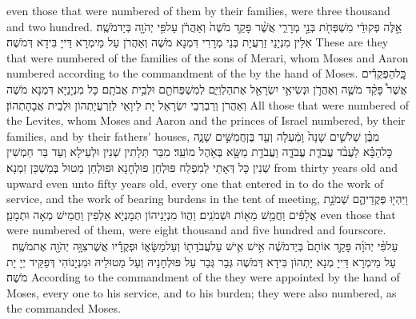 {even those that were numbered of them by their families, were three thousand and two hundred.}{}
{אֵ֣לֶּה פְקוּדֵ֔י מִשְׁפְּחֹ֖ת בְּנֵ֣י מְרָרִ֑י אֲשֶׁ֨ר פָּקַ֤ד מֹשֶׁה֙ וְאַהֲרֹ֔ן עַל\maqqaf פִּ֥י יְהֹוָ֖ה בְּיַד\maqqaf מֹשֶֽׁה׃}
{אִלֵּין מִנְיָנֵי זַרְעֲיָת בְּנֵי מְרָרִי דִּמְנָא מֹשֶׁה וְאַהֲרֹן עַל מֵימְרָא דַּייָ בִּידָא דְּמֹשֶׁה׃}
{These are they that were numbered of the families of the sons of Merari, whom Moses and Aaron numbered according to the commandment of the \lord\space by the hand of Moses.}{}
{כׇּֽל\maqqaf הַפְּקֻדִ֡ים אֲשֶׁר֩ פָּקַ֨ד מֹשֶׁ֧ה וְאַהֲרֹ֛ן וּנְשִׂיאֵ֥י יִשְׂרָאֵ֖ל אֶת\maqqaf הַלְוִיִּ֑ם לְמִשְׁפְּחֹתָ֖ם וּלְבֵ֥ית אֲבֹתָֽם׃}
{כָּל מִנְיָנַיָּא דִּמְנָא מֹשֶׁה וְאַהֲרֹן וְרַבְרְבֵי יִשְׂרָאֵל יָת לֵיוָאֵי לְזַרְעֲיָתְהוֹן וּלְבֵית אֲבָהָתְהוֹן׃}
{All those that were numbered of the Levites, whom Moses and Aaron and the princes of Israel numbered, by their families, and by their fathers’ houses,}{}
{מִבֶּ֨ן שְׁלֹשִׁ֤ים שָׁנָה֙ וָמַ֔עְלָה וְעַ֖ד בֶּן\maqqaf חֲמִשִּׁ֣ים שָׁנָ֑ה כׇּל\maqqaf הַבָּ֗א לַעֲבֹ֨ד עֲבֹדַ֧ת עֲבֹדָ֛ה וַעֲבֹדַ֥ת מַשָּׂ֖א בְּאֹ֥הֶל מוֹעֵֽד׃}
{מִבַּר תְּלָתִין שְׁנִין וּלְעֵילָא וְעַד בַּר חַמְשִׁין שְׁנִין כָּל דְּאָתֵי לְמִפְלַח פּוּלְחַן פּוּלְחָנָא וּפוּלְחַן מַטוּל בְּמַשְׁכַּן זִמְנָא׃}
{from thirty years old and upward even unto fifty years old, every one that entered in to do the work of service, and the work of bearing burdens in the tent of meeting,}{}
{וַיִּהְי֖וּ פְּקֻדֵיהֶ֑ם שְׁמֹנַ֣ת אֲלָפִ֔ים וַחֲמֵ֥שׁ מֵא֖וֹת וּשְׁמֹנִֽים׃}
{וַהֲווֹ מִנְיָנֵיהוֹן תְּמָנְיָא אַלְפִין וַחֲמֵישׁ מְאָה וּתְמָנַן׃}
{even those that were numbered of them, were eight thousand and five hundred and fourscore.}{}
{עַל\maqqaf פִּ֨י יְהֹוָ֜ה פָּקַ֤ד אוֹתָם֙ בְּיַד\maqqaf מֹשֶׁ֔ה אִ֥ישׁ אִ֛ישׁ עַל\maqqaf עֲבֹדָת֖וֹ וְעַל\maqqaf מַשָּׂא֑וֹ וּפְקֻדָ֕יו אֲשֶׁר\maqqaf צִוָּ֥ה יְהֹוָ֖ה אֶת\maqqaf מֹשֶֽׁה׃ \petucha }
{עַל מֵימְרָא דַּייָ מְנָא יָתְהוֹן בִּידָא דְּמֹשֶׁה גְּבַר גְּבַר עַל פּוּלְחָנֵיהּ וְעַל מַטוּלֵיהּ וּמִנְיָנוֹהִי דְּפַקֵּיד יְיָ יָת מֹשֶׁה׃}
{According to the commandment of the \lord\space they were appointed by the hand of Moses, every one to his service, and to his burden; they were also numbered, as the \lord\space commanded Moses.}{}
